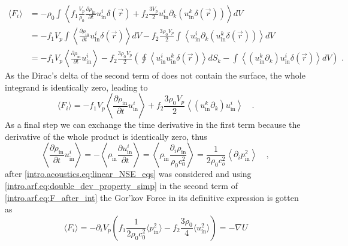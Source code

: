 \begin{align}
    \langle F_i \rangle &= -\rho_0\int\left\langle f_1\frac{V_p}{\rho_0}\frac{\partial\rho_{\text{in}}}{\partial t}u_{\text{in}}^i\delta(\vec r) + f_2\frac{3V_p}{2}u_{\text{in}}^i\partial_k(u_{\text{in}}^k\delta(\vec r))\right\rangle dV \nonumber\\
    &= -f_1V_p\int\left\langle\frac{\partial\rho_{\text{in}}}{\partial t}u_{\text{in}}^i\delta(\vec r)\right\rangle dV - f_2\frac{3\rho_0V_p}{2}\int \left\langle u_{\text{in}}^i\partial_k(u_{\text{in}}^k\delta(\vec r))\right\rangle dV \nonumber\\
    &= -f_1V_p\left\langle\frac{\partial\rho_{\text{in}}}{\partial t}u_{\text{in}}^i\right\rangle - f_2\frac{3\rho_0V_p}{2}\left( \oint \left\langle u_{\text{in}}^iu_{\text{in}}^k\delta(\vec r)\right\rangle dS_k - \int \left\langle (u_{\text{in}}^k\partial_k)u_{\text{in}}^i\delta(\vec r)\right\rangle dV \right)\text{ .}\label{intro.arf.eq:integrate_F_i}
\end{align}
As the Dirac's delta of the second term of does not contain the surface, the whole integrand is identically zero, leading to
\begin{equation}\label{intro.arf.eq:F_after_int}
    \langle F_i \rangle = -f_1V_p\left\langle\frac{\partial\rho_{\text{in}}}{\partial t}u_{\text{in}}^i\right\rangle + f_2\frac{3\rho_0V_p}{2}\left\langle(u_{\text{in}}^k\partial_k)u_{\text{in}}^i\right\rangle\quad.
\end{equation}
As a final step we can exchange the time derivative in the first term because the derivative of the whole product is identically zero, thus
\begin{equation}
    \left\langle\frac{\partial\rho_{\text{in}}}{\partial t}u_{\text{in}}^i\right\rangle = -\left\langle\rho_{\text{in}}\frac{\partial u_{\text{in}}^i}{\partial t}\right\rangle =  \left\langle\rho_{\text{in}}\frac{\partial_i\rho_{\text{in}}}{\rho_0c_0^2}\right\rangle = \frac{1}{2\rho_0 c_o^2}\left\langle\partial_ip_{\text{in}}^2\right\rangle\quad,
\end{equation}
after \eqref{intro.acoustics.eq:linear_NSE_eqs} was considered and using \eqref{intro.arf.eq:double_dev_property_simp} in the second term of \eqref{intro.arf.eq:F_after_int} the Gor'kov Force in its definitive expression is gotten as
\begin{equation}\label{intro.arf.eq:F_grad_U}
    \langle F_i \rangle = -\partial_i V_p\left(f_1\frac{1}{2\rho_0 c_0^2}\langle p_{\text{in}}^2 \rangle - f_2\frac{3\rho_0}{4} \langle u_{\text{in}}^2 \rangle\right) = -\nabla U
\end{equation}
